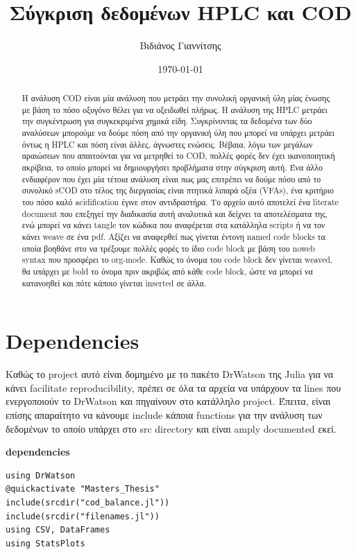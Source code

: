 \documentclass[11pt]{article}
\author{Βιδιάνος Γιαννίτσης}
\date{\today}
\title{Σύγκριση δεδομένων HPLC και COD}
\begin{document}
\maketitle
\tableofcontents

\begin{abstract}
Η ανάλυση COD είναι μία ανάλυση που μετράει την συνολική οργανική ύλη μίας ένωσης με βάση το πόσο οξυγόνο θέλει για να οξειδωθεί πλήρως. Η ανάλυση της HPLC μετράει την συγκέντρωση για συγκεκριμένα χημικά είδη. Συγκρίνοντας τα δεδομένα των δύο αναλύσεων μπορούμε να δούμε πόση από την οργανική ύλη που μπορεί να υπάρχει μετράει όντως η HPLC και πόση είναι άλλες, άγνωστες ενώσεις. Βέβαια, λόγω των μεγάλων αραιώσεων που απαιτούνται για να μετρηθεί το COD, πολλές φορές δεν έχει ικανοποιητική ακρίβεια, το οποίο μπορεί να δημιουργήσει προβλήματα στην σύγκριση αυτή. Ένα άλλο ενδιαφέρον που έχει μία τέτοια ανάλυση είναι πως μας επιτρέπει να δούμε πόσο από το συνολικό sCOD στο τέλος της διεργασίας είναι πτητικά λιπαρά οξέα (VFAs), ένα κριτήριο του πόσο καλό acidification έγινε στον αντιδραστήρα. Το αρχείο αυτό αποτελεί ένα literate document που επεξηγεί την διαδικασία αυτή αναλυτικά και δείχνει τα αποτελέσματα της, ενώ μπορεί να κάνει tangle τον κώδικα που αναφέρεται στα κατάλληλα scripts ή να τον κάνει weave σε ένα pdf. Αξίζει να αναφερθεί πως γίνεται έντονη named code blocks τα οποία βοηθάνε στο να τρέξουμε πολλές φορές το ίδιο code block με βάση του noweb syntax που προσφέρει το org-mode. Καθώς το όνομα του code block δεν γίνεται weaved, θα υπάρχει με bold το όνομα πριν ακριβώς από κάθε code block, ώστε να μπορεί να κατανοηθεί και πότε κάποιο γίνεται inserted σε άλλα.
\end{abstract}

\section{Dependencies}
\label{sec:org7b57b41}
Καθώς το project αυτό είναι δομημένο με το πακέτο DrWatson της Julia για να κάνει facilitate reproducibility, πρέπει σε όλα τα αρχεία να υπάρχουν τα lines που ενεργοποιούν το DrWatson και πηγαίνουν στο κατάλληλο project. Έπειτα, είναι επίσης απαραίτητο να κάνουμε include κάποια functions για την ανάλυση των δεδομένων το οποίο υπάρχει στο src directory και είναι amply documented εκεί.

\textbf{dependencies}
\begin{verbatim}
using DrWatson
@quickactivate "Masters_Thesis"
include(srcdir("cod_balance.jl"))
include(srcdir("filenames.jl"))
using CSV, DataFrames
using StatsPlots
\end{verbatim}
\end{document}
